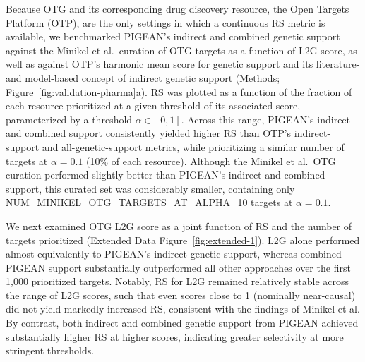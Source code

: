 Because OTG and its corresponding drug discovery resource, the Open Targets Platform (OTP), are the only settings in which a continuous RS metric is available, we benchmarked PIGEAN's indirect and combined genetic support against the Minikel et al.\ curation of OTG targets as a function of L2G score, as well as against OTP's harmonic mean score for genetic support and its literature- and model-based concept of indirect genetic support (Methods; Figure~\ref{fig:validation-pharma}a). RS was plotted as a function of the fraction of each resource prioritized at a given threshold of its associated score, parameterized by a threshold $\alpha \in [0,1]$. Across this range, PIGEAN's indirect and combined support consistently yielded higher RS than OTP's indirect-support and all-genetic-support metrics, while prioritizing a similar number of targets at $\alpha = 0.1$ (10\% of each resource). Although the Minikel et al.\ OTG curation performed slightly better than PIGEAN's indirect and combined support, this curated set was considerably smaller, containing only {{NUM_MINIKEL_OTG_TARGETS_AT_ALPHA_10}} targets at $\alpha = 0.1$.

We next examined OTG L2G score as a joint function of RS and the number of targets prioritized (Extended Data Figure~\ref{fig:extended-1}). L2G alone performed almost equivalently to PIGEAN's indirect genetic support, whereas combined PIGEAN support substantially outperformed all other approaches over the first 1,000 prioritized targets. Notably, RS for L2G remained relatively stable across the range of L2G scores, such that even scores close to 1 (nominally near-causal) did not yield markedly increased RS, consistent with the findings of Minikel et al. By contrast, both indirect and combined genetic support from PIGEAN achieved substantially higher RS at higher scores, indicating greater selectivity at more stringent thresholds.

